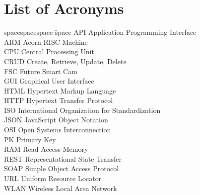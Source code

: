 \chapter*{List of Acronyms}
\thispagestyle{empty}
\begin{tabbing}
spacespacespace \= space \kill
API	 \> 	Application Programming Interface	 \\
ARM	 \> Acorn RISC Machine\\
CPU	 \> 	Central Processing Unit	 \\
CRUD	 \> 	Create, Retrieve, Update, Delete	 \\
FSC	 \> 	Future Smart Cam	 \\
GUI	\>	Graphical User Interface \\
HTML	\>	Hypertext Markup Language \\
HTTP	 \> 	Hypertext Transfer Protocol	 \\
ISO    \>  International Organization for Standardization\\
JSON	\>	JavaScript Object Notation \\
OSI     \>  Open Systems Interconnection\\
PK	 \> 	Primary Key	 \\
RAM    \> Read Access Memory \\
REST    \> Representational State Transfer \\
SOAP	 \> 	Simple Object Access Protocol	 \\
URL	 \> 	Uniform Resource Locator	 \\
WLAN	 \> 	Wireless Local Area Network	 \\
\end{tabbing}
\endinput
